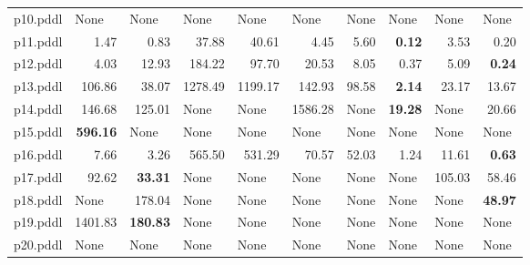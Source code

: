 \documentclass{article}
\begin{document}
\begin{tabular}{@{}lrrrrrrrrr@{}}
p10.pddl & \multicolumn{1}{|l|}{None} & \multicolumn{1}{|l|}{None} & \multicolumn{1}{|l|}{None} & \multicolumn{1}{|l|}{None} & \multicolumn{1}{|l|}{None} & \multicolumn{1}{|l|}{None} & \multicolumn{1}{|l|}{None} & \multicolumn{1}{|l|}{None} & \multicolumn{1}{|l|}{None} \\
p11.pddl & 1.47 & 0.83 & 37.88 & 40.61 & 4.45 & 5.60 & \textbf{0.12} & 3.53 & 0.20 \\
p12.pddl & 4.03 & 12.93 & 184.22 & 97.70 & 20.53 & 8.05 & 0.37 & 5.09 & \textbf{0.24} \\
p13.pddl & 106.86 & 38.07 & 1278.49 & 1199.17 & 142.93 & 98.58 & \textbf{2.14} & 23.17 & 13.67 \\
p14.pddl & 146.68 & 125.01 & \multicolumn{1}{|l|}{None} & \multicolumn{1}{|l|}{None} & 1586.28 & \multicolumn{1}{|l|}{None} & \textbf{19.28} & \multicolumn{1}{|l|}{None} & 20.66 \\
p15.pddl & \textbf{596.16} & \multicolumn{1}{|l|}{None} & \multicolumn{1}{|l|}{None} & \multicolumn{1}{|l|}{None} & \multicolumn{1}{|l|}{None} & \multicolumn{1}{|l|}{None} & \multicolumn{1}{|l|}{None} & \multicolumn{1}{|l|}{None} & \multicolumn{1}{|l|}{None} \\
p16.pddl & 7.66 & 3.26 & 565.50 & 531.29 & 70.57 & 52.03 & 1.24 & 11.61 & \textbf{0.63} \\
p17.pddl & 92.62 & \textbf{33.31} & \multicolumn{1}{|l|}{None} & \multicolumn{1}{|l|}{None} & \multicolumn{1}{|l|}{None} & \multicolumn{1}{|l|}{None} & \multicolumn{1}{|l|}{None} & 105.03 & 58.46 \\
p18.pddl & \multicolumn{1}{|l|}{None} & 178.04 & \multicolumn{1}{|l|}{None} & \multicolumn{1}{|l|}{None} & \multicolumn{1}{|l|}{None} & \multicolumn{1}{|l|}{None} & \multicolumn{1}{|l|}{None} & \multicolumn{1}{|l|}{None} & \textbf{48.97} \\
p19.pddl & 1401.83 & \textbf{180.83} & \multicolumn{1}{|l|}{None} & \multicolumn{1}{|l|}{None} & \multicolumn{1}{|l|}{None} & \multicolumn{1}{|l|}{None} & \multicolumn{1}{|l|}{None} & \multicolumn{1}{|l|}{None} & \multicolumn{1}{|l|}{None} \\
p20.pddl & \multicolumn{1}{|l|}{None} & \multicolumn{1}{|l|}{None} & \multicolumn{1}{|l|}{None} & \multicolumn{1}{|l|}{None} & \multicolumn{1}{|l|}{None} & \multicolumn{1}{|l|}{None} & \multicolumn{1}{|l|}{None} & \multicolumn{1}{|l|}{None} & \multicolumn{1}{|l|}{None} \\
\end{tabular}
\end{document}
